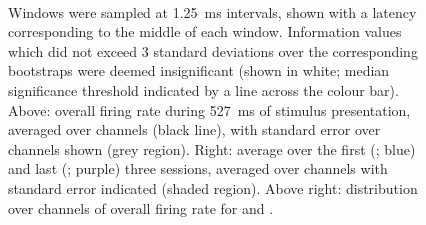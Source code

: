 \begin{figure}[htbp]%
    \centering
    \hspace*{\fill}
    \hspace*{\fill}\hspace{.2cm}\hspace*{\fill}
    \hspace*{\fill}
    \\
    \hspace*{\fill}
    \hspace*{\fill}\hspace{.2cm}\hspace*{\fill}
    \hspace*{\fill}
    \caption{
Windows were sampled at \SI{1.25}{\milli\second} intervals, shown with a latency corresponding to the middle of each window.
Information values which did not exceed \num{3} standard deviations over the corresponding bootstraps were deemed insignificant (shown in white; median significance threshold indicated by a line across the colour bar).
Above: overall firing rate during \SI{527}{\milli\second} of stimulus presentation, averaged over channels (black line), with standard error over channels shown (grey region).
Right: average over the first (; blue) and last (; purple) three sessions, averaged over channels with standard error indicated (shaded region).
Above right: distribution over channels of overall firing rate for  and .
    \label{fig:fr_hm}
}
\end{figure}


